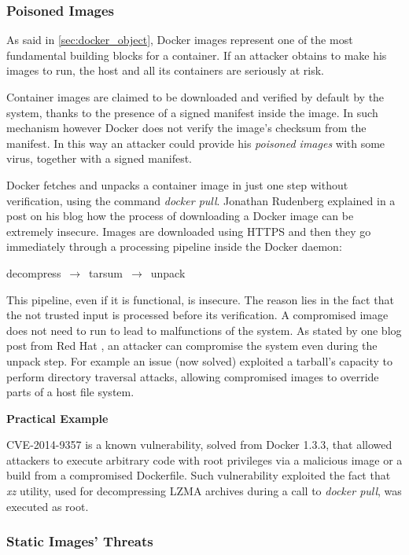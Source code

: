 \documentclass[a4paper,12pt]{article}
\begin{document}
\subsubsection{Poisoned Images}

As said in \ref{sec:docker_object}, Docker images represent
one of the most fundamental building blocks for a container. If an attacker
obtains to make his images to run, the host and all its containers are seriously
at risk. \par Container images are claimed to be downloaded and verified by
default by the system, thanks to the presence of a signed manifest inside the
image. In such mechanism however Docker does not verify the image's checksum
from the manifest. In this way an attacker could provide his \textit{poisoned
images} with some virus, together with a signed manifest. \par Docker fetches
and unpacks a container image in just one step without verification, using the
command \textit{docker pull}. Jonathan Rudenberg explained in a post
\cite{docker_image_insecurity} on his blog how the process of downloading a
Docker image can be extremely insecure. Images are downloaded using HTTPS and
then they go immediately through a processing pipeline inside the Docker daemon:
\bigbreak\centerline{decompress $\,\to\,$ tarsum $\,\to\,$ unpack}\bigbreak This
pipeline, even if it is functional, is insecure. The reason lies in the fact
that the not trusted input is processed before its verification. A compromised
image does not need to run to lead to malfunctions of the system. As stated by
one blog post from Red Hat \cite{docker_pull_red_hat}, an attacker can
compromise the system even during the unpack step. For example an issue (now
solved) exploited a tarball's capacity to perform directory traversal attacks,
allowing compromised images to override parts of a host file system.

\bigbreak\textbf{Practical Example}\bigbreak 

CVE-2014-9357 \cite{CVE-2014-9357} is a known vulnerability, solved from Docker
1.3.3, that allowed attackers to execute arbitrary code with root privileges via
a malicious image or a build from a compromised Dockerfile. Such vulnerability
exploited the fact that \textit{xz} utility, used for decompressing LZMA
archives during a call to \textit{docker pull}, was executed as root. 

\subsubsection{Static Images' Threats}
\end{document}
